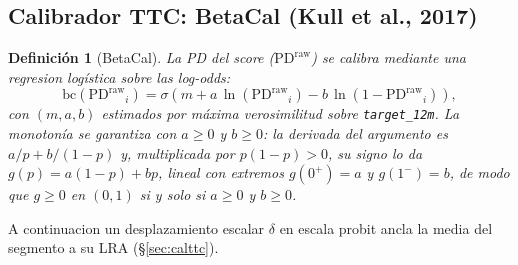 \documentclass[12pt, a4paper]{article}
\newcommand{\PDraw}{\ensuremath{\mathrm{PD}^{\mathrm{raw}}}}
\newtheorem{definicion}{Definición}[section]
\begin{document}
\subsection{Calibrador TTC: BetaCal (Kull et al., 2017)}
\begin{definicion}[BetaCal]
\label{def:beta}
La PD del score (\PDraw) se calibra mediante una regresion logística sobre las log-odds:
\begin{equation}
  \mathrm{bc}(\PDraw_i) = \sigma\!\left(m + a\,\ln(\PDraw_i) - b\,\ln(1-\PDraw_i)\right),
\end{equation}
con $(m,a,b)$ estimados por máxima verosimilitud sobre \texttt{target\_12m}. La monotonía se
garantiza con $a\ge0$ y $b\ge0$: la derivada del argumento es $a/p+b/(1-p)$ y, multiplicada por
$p(1-p)>0$, su signo lo da $g(p)=a(1-p)+bp$, lineal con extremos $g(0^+)=a$ y $g(1^-)=b$, de modo
que $g\ge0$ en $(0,1)$ \emph{si y solo si} $a\ge0$ y $b\ge0$.
\end{definicion}
A continuacion un desplazamiento escalar $\delta$ en escala probit ancla la media del segmento a su
LRA (\S\ref{sec:calttc}).
\end{document}
